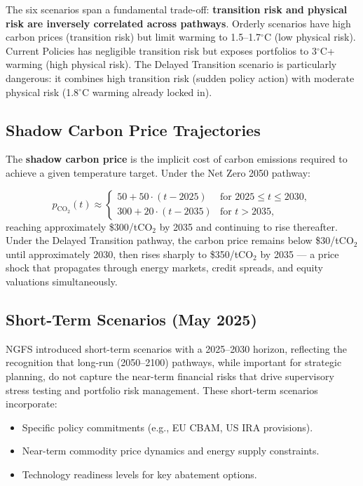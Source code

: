 \documentclass[11pt, a4paper]{article}
\theoremstyle{definition}
\theoremstyle{plain}
\theoremstyle{remark}
\begin{document}
\begin{keyresult}
The six scenarios span a fundamental trade-off: \textbf{transition risk and
physical risk are inversely correlated across pathways}.
Orderly scenarios have high carbon prices (transition risk) but limit warming
to 1.5--1.7$^\circ$C (low physical risk).
Current Policies has negligible transition risk but exposes portfolios to
3$^\circ$C+ warming (high physical risk).
The Delayed Transition scenario is particularly dangerous: it combines high
transition risk (sudden policy action) with moderate physical risk (1.8$^\circ$C
warming already locked in).
\end{keyresult}

\subsection{Shadow Carbon Price Trajectories}

The \textbf{shadow carbon price} is the implicit cost of carbon emissions required
to achieve a given temperature target.
Under the Net Zero 2050 pathway:

\begin{equation}\label{eq:carbon-price-path}
    p_{\text{CO}_2}(t) \approx
    \begin{cases}
        50 + 50 \cdot (t - 2025) & \text{for } 2025 \leq t \leq 2030, \\
        300 + 20 \cdot (t - 2035) & \text{for } t > 2035,
    \end{cases}
\end{equation}
reaching approximately \$300/tCO$_2$ by 2035 and continuing to rise thereafter.
Under the Delayed Transition pathway, the carbon price remains below \$30/tCO$_2$
until approximately 2030, then rises sharply to \$350/tCO$_2$ by 2035 --- a
price shock that propagates through energy markets, credit spreads, and equity
valuations simultaneously.

\subsection{Short-Term Scenarios (May 2025)}

NGFS introduced short-term scenarios with a 2025--2030 horizon, reflecting the
recognition that long-run (2050--2100) pathways, while important for strategic
planning, do not capture the near-term financial risks that drive supervisory
stress testing and portfolio risk management.
These short-term scenarios incorporate:
\begin{itemize}
    \item Specific policy commitments (e.g., EU CBAM, US IRA provisions).
    \item Near-term commodity price dynamics and energy supply constraints.
    \item Technology readiness levels for key abatement options.
\end{itemize}
\end{document}
